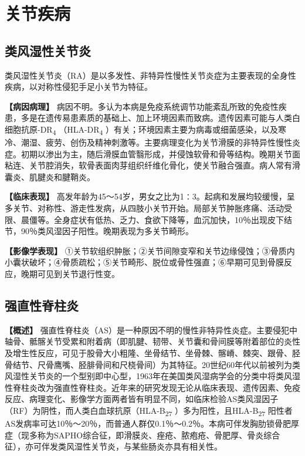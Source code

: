 \section{关节疾病}

\subsection{类风湿性关节炎}

类风湿性关节炎（RA）是以多发性、非特异性慢性关节炎症为主要表现的全身性疾病，以对称性侵犯手足小关节为特征。

\textbf{【病因病理】}
病因不明。多认为本病是免疫系统调节功能紊乱所致的免疫性疾患，多是在遗传易患素质的基础上、加上环境因素而致病。遗传因素可能与人类白细胞抗原-DR\textsubscript{4}
（HLA-DR\textsubscript{4}
）有关；环境因素主要为病毒或细菌感染，以及寒冷、潮湿、疲劳、创伤及精神刺激等。主要病理变化为关节滑膜的非特异性慢性炎症。初期以渗出为主，随后滑膜血管翳形成，并侵蚀软骨和骨等结构。晚期关节面粘连、关节腔消失，软骨表面肉芽组织纤维化骨化，使关节融合强直。病人常有滑囊炎、肌腱炎和腱鞘炎。

\textbf{【临床表现】}
高发年龄为45～54岁，男女之比为1∶3。起病和发展均较缓慢，呈多关节、对称性、游走性发病，从四肢小关节开始。局部关节肿胀疼痛、活动受限、晨僵等。全身症状有低热、乏力、食欲下降等，血沉加快，10％出现皮下结节，90％类风湿因子阳性。晚期表现为多关节畸形。

\textbf{【影像学表现】}
①关节软组织肿胀；②关节间隙变窄和关节边缘侵蚀；③骨质内小囊状破坏；④骨质疏松；⑤关节畸形、脱位或骨性强直；⑥早期可见到骨膜反应，晚期可见到关节退行性变。

\subsection{强直性脊柱炎}

\textbf{【概述】}
强直性脊柱炎（AS）是一种原因不明的慢性非特异性炎症。主要侵犯中轴骨、骶髂关节受累和附着病（即肌腱、韧带、关节囊和骨间膜等附着部位的炎性及增生性反应，可见于股骨大小粗隆、坐骨结节、坐骨棘、髂嵴、棘突、跟骨、胫骨结节、尺骨鹰嘴、胫腓骨间和尺桡骨间）为其特征。20世纪60年代以前被列为类风湿性关节炎的一个型别即中心型，1963年在美国类风湿病学会的分类中将类风湿性脊柱炎改为强直性脊柱炎。近年来的研究发现无论从临床表现、遗传因素、免疫反应、病理变化、影像学方面两者皆有明显不同，如临床检验AS类风湿因子（RF）为阴性，而人类白血球抗原（HLA-B\textsubscript{27}
）多为阳性，且HLA-B\textsubscript{27}
阳性者AS发病率可达10％～20％，而普通人群仅0.1％～0.2％。本病可伴发胸肋锁骨肥厚症（现多称为SAPHO综合征，即滑膜炎、痤疮、脓疱疮、骨肥厚、骨炎综合征），亦可伴发类风湿性关节炎，与某些肠炎亦具有相关性。

